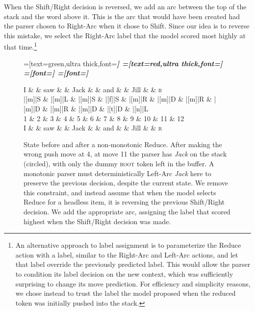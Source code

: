 \documentclass[11pt,letterpaper]{article}
\begin{document}
When the Shift/Right decision is reversed, we add an arc between the top of the stack
and the word above it. This is the arc that would have been created had the parser
chosen to Right-Arc when it chose to Shift. Since our idea is to reverse this mistake,
we select the Right-Arc label that the model scored most highly at that
time.\footnote{An alternative approach to label assignment is to parameterize
the Reduce action with a label, similar to the Right-Arc and Left-Arc actions,
and let that label override the previously predicted label. This would allow the
parser to condition its label decision on the new context, which was sufficiently
surprising to change its move prediction.
For efficiency and simplicity reasons, we chose instead to trust the label the model
proposed when the reduced token was initially pushed into the stack.}

\begin{figure}
    \centering
    \begin{dependency}[theme=simple]
    =[text=green,ultra thick,font=\bfseries\itshape]
    =[text=red,ultra thick,font=\bfseries\itshape]
    =[font=\bfseries\itshape]
    =[font=\itshape]
    \begin{deptext}[column sep=.075cm, row sep=.1ex]
        I \&           \& saw \&          \& Jack       \& \& and     \&           \& Jill \&   \& \textsc{r} \\
       |[m]|S \& |[m]|L \& |[m]|S   \& |[f]|S \& |[m]|R \& |[m]|D \& |[m]|R \& |[m]|D \& |[m]|R \& |[m]|D \& |[t]|D \& |[n]|L \\
            1 \&     2       \& 3  \&   4      \& 5          \& 6 \& 7     \& 8 \& 9 \& 10 \& 11 \& 12 \\
            I \&           \& saw \&          \& Jack       \& \& and     \&           \& Jill \& \& \textsc{r} \\
\end{deptext}
    
    
\end{dependency}
\caption{
State before and after a non-monotonic Reduce.
After making the wrong push move at 4, at move 11
the parser has \emph{Jack} on the stack (circled), with only the dummy \textsc{root}
token left in the buffer. A monotonic parser must deterministically Left-Arc
\emph{Jack} here to preserve the previous decision, despite the current state.
We remove this constraint, and instead assume that when the model selects Reduce
for a headless item, it is reversing the previous Shift/Right decision. We add
the appropriate arc, assigning the label that scored highest when the Shift/Right
decision was made.
\label{fig:adduce}}
\end{figure}
\end{document}
